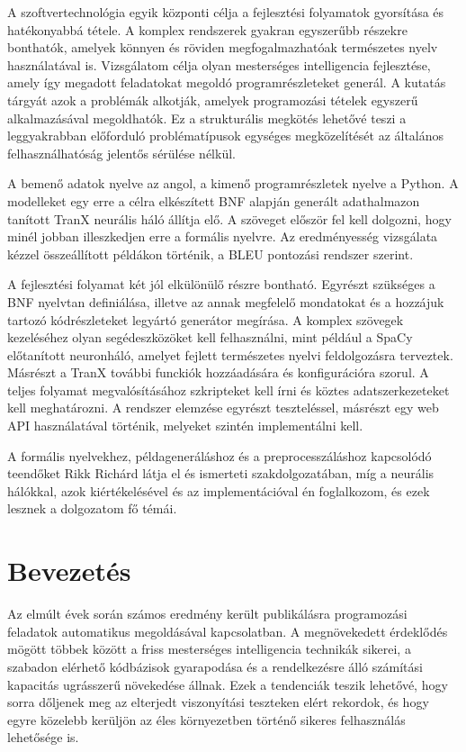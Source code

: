 \documentclass[twoside, 12pt]{report}
\begin{document}
A szoftvertechnológia egyik központi célja a fejlesztési folyamatok gyorsítása és hatékonyabbá tétele. A komplex rendszerek gyakran egyszerűbb részekre bonthatók, amelyek könnyen és röviden megfogalmazhatóak természetes nyelv használatával is. Vizsgálatom célja olyan mesterséges intelligencia fejlesztése, amely így megadott feladatokat megoldó programrészleteket generál. A kutatás tárgyát azok a problémák alkotják, amelyek programozási tételek egyszerű alkalmazásával megoldhatók. Ez a strukturális megkötés lehetővé teszi a leggyakrabban előforduló problématípusok egységes megközelítését az általános felhasználhatóság jelentős sérülése nélkül.

A bemenő adatok nyelve az angol, a kimenő programrészletek nyelve a Python. A modelleket egy erre a célra elkészített BNF alapján generált adathalmazon tanított TranX neurális háló állítja elő. A szöveget először fel kell dolgozni, hogy minél jobban illeszkedjen erre a formális nyelvre. Az eredményesség vizsgálata kézzel összeállított példákon történik, a BLEU pontozási rendszer szerint.

A fejlesztési folyamat két jól elkülönülő részre bontható. Egyrészt szükséges a BNF nyelvtan definiálása, illetve az annak megfelelő mondatokat és a hozzájuk tartozó kódrészleteket legyártó generátor megírása. A komplex szövegek kezeléséhez olyan segédeszközöket kell felhasználni, mint például a SpaCy előtanított neuronháló, amelyet fejlett természetes nyelvi feldolgozásra terveztek. Másrészt a TranX további funckiók hozzáadására és konfigurációra szorul. A teljes folyamat megvalósításához szkripteket kell írni és köztes adatszerkezeteket kell meghatározni. A rendszer elemzése egyrészt teszteléssel, másrészt egy web API használatával történik, melyeket szintén implementálni kell.

A formális nyelvekhez, példageneráláshoz és a preprocesszáláshoz kapcsolódó teendőket Rikk Richárd látja el és ismerteti szakdolgozatában, míg a neurális hálókkal, azok kiértékelésével és az implementációval én foglalkozom, és ezek lesznek a dolgozatom fő témái.

\tableofcontents

\newpage
{}

\chapter{Bevezetés}

Az elmúlt évek során számos eredmény került publikálásra programozási feladatok automatikus megoldásával kapcsolatban. A megnövekedett érdeklődés mögött többek között a friss mesterséges intelligencia technikák sikerei, a szabadon elérhető kódbázisok gyarapodása és a rendelkezésre álló számítási kapacitás ugrásszerű növekedése állnak. Ezek a tendenciák teszik lehetővé, hogy sorra dőljenek meg az elterjedt viszonyítási teszteken elért rekordok, és hogy egyre közelebb kerüljön az éles környezetben történő sikeres felhasználás lehetősége is.
\end{document}
